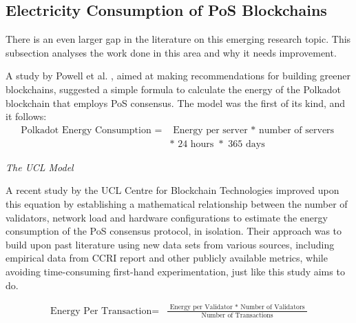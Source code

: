 

\subsection{ Electricity Consumption of PoS Blockchains }
\label{LitRevExistingModels}

There is an even larger gap in the literature on this emerging research topic. This subsection analyses the work done in this area and why it needs improvement.

A study by Powell et al. \cite{Powell2021AWARENESSBLOCKCHAIN}, aimed at making recommendations for building greener blockchains, suggested a simple formula to calculate the energy of the Polkadot blockchain that employs PoS consensus. The model was the first of its kind, and it follows: 
\begin{align}
   \boldsymbol{\mathrm{\text{Polkadot Energy Consumption } = }}
   &\boldsymbol{\mathrm{\text{ Energy per server }* \text{ number of servers } } } \nonumber\\
   &\boldsymbol{\mathrm{* \text{ 24 hours } *\text{ 365 days }}} \nonumber
\end{align}

\textit{The UCL Model } 

A recent study by the UCL Centre for Blockchain Technologies \cite{PlattDiscussionProof-of-Work} improved upon this equation by establishing a mathematical relationship between the number of validators, network load and hardware configurations to estimate the energy consumption of the PoS consensus protocol, in isolation. Their approach was to build upon past literature using new data sets from various sources, including empirical data from CCRI report \cite{CryptoCarbonRatingsInstitute2022TheNetwork} and other publicly available metrics, while avoiding time-consuming first-hand experimentation, just like this study aims to do. 

\begin{align}
   \boldsymbol{\mathrm{\text{Energy Per Transaction} = }}
   &\boldsymbol{\mathrm{\frac{\text{ Energy per Validator }* \text{ Number of Validators } }{\text{ Number of Transactions }}} } \nonumber\\ \nonumber
\end{align}

